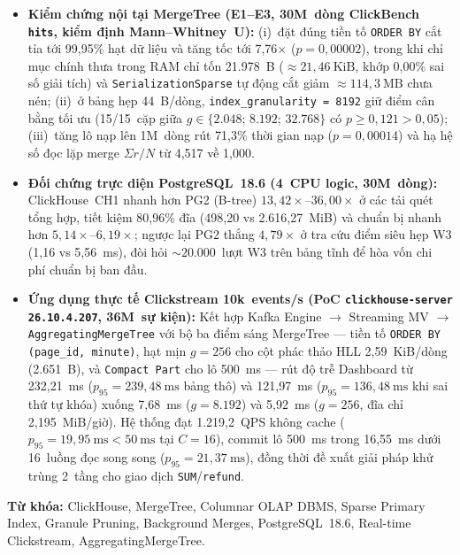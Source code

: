 \documentclass[13pt,a4paper]{report}
\begin{document}
\begin{itemize}
    \setlength{\itemsep}{2pt}
    \setlength{\parskip}{0pt}
    \setlength{\parsep}{0pt}
    \item \textbf{Kiểm chứng nội tại MergeTree (E1--E3, 30M~dòng ClickBench \texttt{hits}, kiểm định Mann--Whitney~U):} (i)~đặt đúng tiền tố \texttt{ORDER BY} cắt tỉa tới 99,95\% hạt dữ liệu và tăng tốc tới 7,76${\times}$ ($p = 0{,}00002$), trong khi chỉ mục chính thưa trong RAM chỉ tốn 21.978~B ($\approx 21{,}46~\text{KiB}$, khớp 0,00\% sai số giải tích) và \texttt{SerializationSparse} tự động cắt giảm $\approx 114{,}3~\text{MB}$ chưa nén; (ii)~ở bảng hẹp 44~B/dòng, \texttt{index\_\allowbreak{}granularity = 8192} giữ điểm cân bằng tối ưu (15/15~cặp giữa $g \in \{2.048;\, 8.192;\, 32.768\}$ có $p \ge 0{,}121 > 0{,}05$); (iii)~tăng lô nạp lên 1M~dòng rút 71,3\% thời gian nạp ($p = 0{,}00014$) và hạ hệ số đọc lặp merge $\Sigma r / N$ từ 4,517 về 1,000.
    \item \textbf{Đối chứng trực diện PostgreSQL~18.6 (4~CPU logic, 30M~dòng):} ClickHouse~CH1 nhanh hơn PG2 (B-tree) $13{,}42{\times}\text{--}36{,}00{\times}$ ở các tải quét tổng hợp, tiết kiệm 80,96\% đĩa (498,20 vs 2.616,27~MiB) và chuẩn bị nhanh hơn $5{,}14{\times}\text{--}6{,}19{\times}$; ngược lại PG2 thắng $4{,}79{\times}$ ở tra cứu điểm siêu hẹp W3 (1,16 vs 5,56~ms), đòi hỏi $\sim 20.000$~lượt W3 trên bảng tĩnh để hòa vốn chi phí chuẩn bị ban đầu.
    \item \textbf{Ứng dụng thực tế Clickstream 10k~events/s (PoC \texttt{clickhouse-server 26.10.4.207}, 36M~sự kiện):} Kết hợp Kafka Engine $\rightarrow$ Streaming MV $\rightarrow$ \texttt{AggregatingMergeTree} với bộ ba điểm sáng MergeTree --- tiền tố \texttt{ORDER BY (page\_\allowbreak{}id, minute)}, hạt mịn $g = 256$ cho cột phác thảo HLL 2,59~KiB/dòng (2.651~B), và \texttt{Compact Part} cho lô 500~ms --- rút độ trễ Dashboard từ 232,21~ms ($p_{95} = 239{,}48~\text{ms}$ bảng thô) và 121,97~ms ($p_{95} = 136{,}48~\text{ms}$ khi sai thứ tự khóa) xuống 7,68~ms ($g = 8.192$) và 5,92~ms ($g = 256$, đĩa chỉ 2,195~MiB/giờ). Hệ thống đạt 1.219,2~QPS không cache ($p_{95} = 19{,}95~\text{ms} < 50~\text{ms}$ tại $C = 16$), commit lô 500~ms trong 16,55~ms dưới 16~luồng đọc song song ($p_{95} = 21{,}37~\text{ms}$), đồng thời đề xuất giải pháp khử trùng 2~tầng cho giao dịch \texttt{SUM}/\texttt{refund}.
\end{itemize}

\vspace{0.25cm}
\noindent\textbf{Từ khóa:} ClickHouse, MergeTree, Columnar OLAP DBMS, Sparse Primary Index, Granule Pruning, Background Merges, PostgreSQL~18.6, Real-time Clickstream, AggregatingMergeTree.
\clearpage
\end{document}
